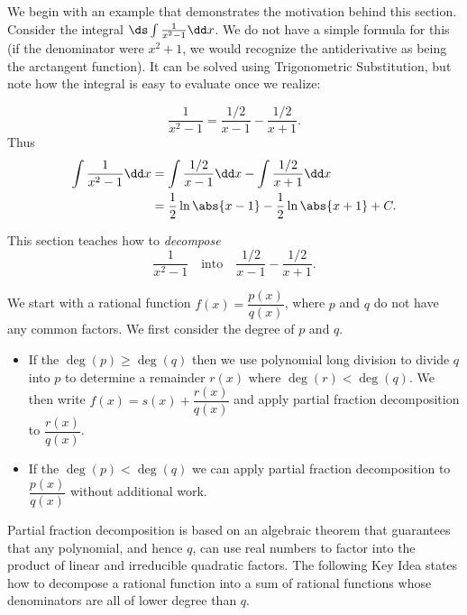 We begin with an example that demonstrates the motivation behind this section. Consider the integral $\ds\int \frac{1}{x^2-1}\dd x$. We do not have a simple formula for this (if the denominator were $x^2+1$, we would recognize the antiderivative as being the arctangent function). It can be solved using Trigonometric Substitution, but note how the integral is easy to evaluate once we realize:

\[\frac{1}{x^2-1} = \frac{1/2}{x-1} - \frac{1/2}{x+1}.\]
Thus 
\begin{align*}
\int\frac{1}{x^2-1}\dd x &= \int\frac{1/2}{x-1}\dd x - \int\frac{1/2}{x+1}\dd x \\
			&= \frac12\ln\abs{x-1}-\frac12\ln\abs{x+1}+C.
\end{align*}

This section teaches how to \emph{decompose}
\[\frac1{x^2-1}\quad  \text{into}\quad  \frac{1/2}{x-1}-\frac{1/2}{x+1}.\]

We start with a rational function $f(x)=\dfrac{p(x)}{q(x)}$, where $p$ and $q$ do not have any common factors. We first consider the degree of $p$ and $q$. 
\begin{itemize}
	\item If the $\deg(p)\ge\deg(q)$ then we use polynomial long division to divide $q$ into $p$ to determine a remainder $r(x)$ where $\deg(r)<\deg(q)$. We then write $f(x) =s(x)+\dfrac{r(x)}{q(x)}$ and apply partial fraction decomposition to $\dfrac{r(x)}{q(x)}$.
	\item If the $\deg(p)<\deg(q)$ we can apply partial fraction decomposition to $\dfrac{p(x)}{q(x)}$ without additional work.
\end{itemize}

Partial fraction decomposition is based on an algebraic theorem that guarantees that any polynomial, and hence $q$, can use real numbers to factor into the product of linear and irreducible quadratic factors.
The following Key Idea states how to decompose a rational function into a sum of rational functions whose denominators are all of lower degree than $q$.


